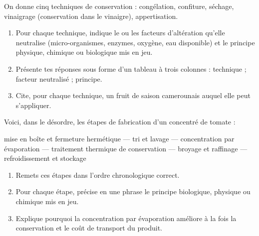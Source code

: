 \documentclass[11pt]{article}
\newcounter{popsec}
\newcounter{popsub}
\newcommand{\courssub}[1]{%
  \stepcounter{popsub}%
  \par\vspace{9pt}\noindent{\popxbold\fontsize{11.5}{13}\selectfont\color{popink}{\color{poporange}\thepopsec.\thepopsub}\hspace{6pt}#1}\par\nopagebreak\vspace{4pt}
}
\begin{document}
\courssub{Je m'entraîne}

\begin{exercice}
On donne cinq techniques de conservation : congélation, confiture, séchage, vinaigrage (conservation dans le vinaigre), appertisation.
\begin{enumerate}
\item Pour chaque technique, indique le ou les facteurs d'altération qu'elle neutralise (micro-organismes, enzymes, oxygène, eau disponible) et le principe physique, chimique ou biologique mis en jeu.
\item Présente tes réponses sous forme d'un tableau à trois colonnes : technique ; facteur neutralisé ; principe.
\item Cite, pour chaque technique, un fruit de saison camerounais auquel elle peut s'appliquer.
\end{enumerate}
\end{exercice}

\begin{exercice}
Voici, dans le désordre, les étapes de fabrication d'un concentré de tomate :
\begin{center}
mise en boîte et fermeture hermétique — tri et lavage — concentration par évaporation — traitement thermique de conservation — broyage et raffinage — refroidissement et stockage
\end{center}
\begin{enumerate}
\item Remets ces étapes dans l'ordre chronologique correct.
\item Pour chaque étape, précise en une phrase le principe biologique, physique ou chimique mis en jeu.
\item Explique pourquoi la concentration par évaporation améliore à la fois la conservation et le coût de transport du produit.
\end{enumerate}
\end{exercice}
\end{document}
